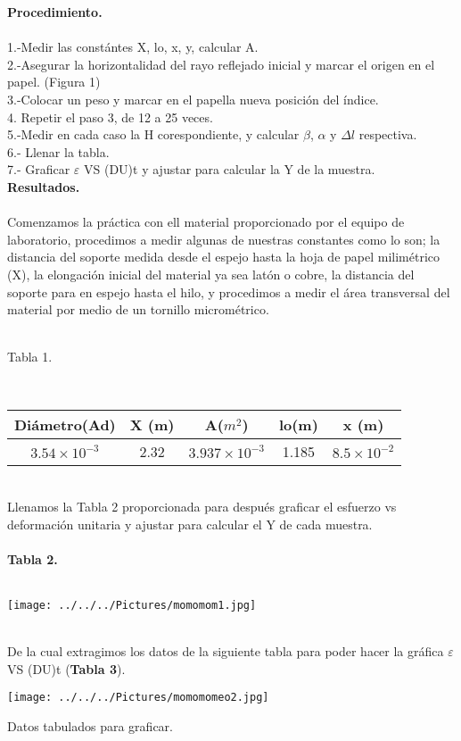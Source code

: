 \documentclass[10pt,a4paper]{article}
\begin{document}
\textbf{Procedimiento.}\\
\\
1.-Medir las const\'{a}ntes X, lo, x, y, calcular A.\\
2.-Asegurar la horizontalidad del rayo reflejado inicial y marcar el origen en el papel. (Figura 1)\\
3.-Colocar un peso y marcar en el papella nueva posici\'{o}n del \'{i}ndice. \\
4. Repetir el paso 3, de 12 a 25 veces.\\
5.-Medir en cada caso la H corespondiente, y calcular $\beta$, $\alpha$ y $\Delta l$ respectiva.\\
6.- Llenar la tabla.\\
7.- Graficar $\varepsilon$ VS (DU)t y ajustar para calcular la Y de la muestra.\\

\textbf{Resultados.}\\
\\
Comenzamos la pr\'{a}ctica con ell material proporcionado por el equipo de laboratorio, procedimos a medir algunas de nuestras constantes como lo son; la distancia del soporte medida desde el espejo hasta la hoja de papel milim\'{e}trico (X), la elongaci\'{o}n inicial del material ya sea lat\'{o}n o cobre, la distancia del soporte para en espejo hasta el hilo, y procedimos a medir el \'{a}rea transversal del material por medio de un tornillo microm\'{e}trico. \\
\medskip
\\
\medskip
\caption{Tabla 1.} 
\\ 
\begin{tabular}{|c|c|c|c|c|}
\hline 
Di\'{a}metro(Ad) & X (m) & A(${ m }^{ 2 }$) & lo(m)& x (m)\\ 
\hline 
${ 3.54\times 10 }^{ -3 }$ & 2.32 & ${ 3.937\times 10 }^{ -3 }$ & 1.185 &${ 8.5\times 10 }^{ -2 }$ \\
\hline 
\end{tabular}\\

\medskip
Llenamos la Tabla 2 proporcionada para despu\'{e}s graficar el esfuerzo vs deformaci\'{o}n unitaria y ajustar para calcular el Y de cada muestra.\\
\\
\textbf{Tabla 2.}\\
\\
\begin{figure 2}
\centering
\texttt{[image: ../../../Pictures/momomom1.jpg]} 
\\
\end{figure 2}
\\
De la cual extragimos los datos de la siguiente tabla para poder hacer la gr\'{a}fica $\varepsilon$ VS (DU)t (\textbf{Tabla 3}).
\begin{figure 3}
\centering
\texttt{[image: ../../../Pictures/momomomeo2.jpg]} 
\\
\centering
\caption{Datos tabulados para graficar.}
\end{figure 3}
\\
\end{document}
